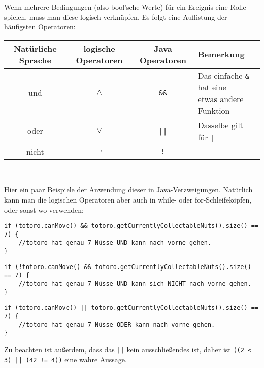 	\begin{Infobox}[Logische Operatoren]
	
	Wenn mehrere Bedingungen (also bool'sche Werte) für ein Ereignis eine Rolle spielen, muss man diese logisch verknüpfen.
	Es folgt eine Auflistung der häufigsten Operatoren:

	\begin{center}
		\begin{tabular}{ c | c | c | l}
			Natürliche Sprache & logische Operatoren & Java Operatoren & Bemerkung \\
			\hline
			und  & $\wedge$ & \texttt{\&\&} & \minibox{Das einfache \texttt{\&} hat eine\\etwas andere Funktion} \\
			oder & $\vee$ & \texttt{||} & Dasselbe gilt für \texttt{|} \\
			nicht & $\neg$ & \texttt{!} &\\
		\end{tabular}\\
	\end{center}

	Hier ein paar Beispiele der Anwendung dieser in Java-Verzweigungen.
	Natürlich kann man die logischen Operatoren aber auch in while- oder for-Schleifeköpfen, oder sonst wo verwenden:

	\begin{lstlisting}[numbers=none]
if (totoro.canMove() && totoro.getCurrentlyCollectableNuts().size() == 7) {
	//totoro hat genau 7 Nüsse UND kann nach vorne gehen.
}
	\end{lstlisting}

	\begin{lstlisting}[numbers=none]
if (!totoro.canMove() && totoro.getCurrentlyCollectableNuts().size() == 7) {
	//totoro hat genau 7 Nüsse UND kann sich NICHT nach vorne gehen.
}
	\end{lstlisting}

	\begin{lstlisting}[numbers=none]
if (totoro.canMove() || totoro.getCurrentlyCollectableNuts().size() == 7) {
	//totoro hat genau 7 Nüsse ODER kann nach vorne gehen.
}
	\end{lstlisting}

	Zu beachten ist außerdem, dass das  \lstinline{||} kein ausschließendes  ist, daher ist \lstinline{((2 < 3) || (42 != 4))} eine wahre Aussage.

\end{Infobox}


